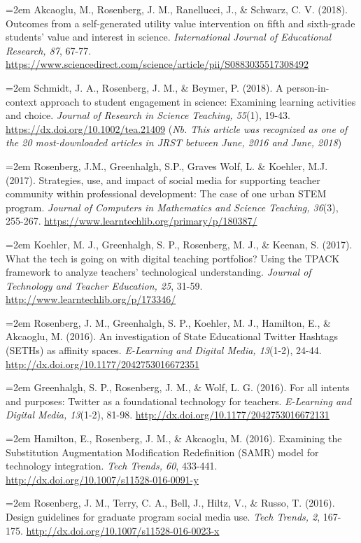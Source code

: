 \documentclass[14,]{article}
\begin{document}
\hangindent=2em Akcaoglu, M., Rosenberg, J. M., Ranellucci, J., \&
Schwarz, C. V. (2018). Outcomes from a self-generated utility value
intervention on fifth and sixth-grade students' value and interest in
science. \emph{International Journal of Educational Research, 87},
67-77.
\url{https://www.sciencedirect.com/science/article/pii/S0883035517308492}

\hangindent=2em Schmidt, J. A., Rosenberg, J. M., \& Beymer, P. (2018).
A person-in-context approach to student engagement in science: Examining
learning activities and choice. \emph{Journal of Research in Science
Teaching, 55}(1), 19-43. \url{https://dx.doi.org/10.1002/tea.21409}
(\emph{Nb. This article was recognized as one of the 20 most-downloaded
articles in JRST between June, 2016 and June, 2018})

\hangindent=2em Rosenberg, J.M., Greenhalgh, S.P., Graves Wolf, L. \&
Koehler, M.J. (2017). Strategies, use, and impact of social media for
supporting teacher community within professional development: The case
of one urban STEM program. \emph{Journal of Computers in Mathematics and
Science Teaching, 36}(3), 255-267.
\url{https://www.learntechlib.org/primary/p/180387/}

\hangindent=2em Koehler, M. J., Greenhalgh, S. P., Rosenberg, M. J., \&
Keenan, S. (2017). What the tech is going on with digital teaching
portfolios? Using the TPACK framework to analyze teachers' technological
understanding. \emph{Journal of Technology and Teacher Education, 25},
31-59. \url{http://www.learntechlib.org/p/173346/}

\hangindent=2em Rosenberg, J. M., Greenhalgh, S. P., Koehler, M. J.,
Hamilton, E., \& Akcaoglu, M. (2016). An investigation of State
Educational Twitter Hashtags (SETHs) as affinity spaces.
\emph{E-Learning and Digital Media, 13}(1-2), 24-44.
\url{http://dx.doi.org/10.1177/2042753016672351}

\hangindent=2em Greenhalgh, S. P., Rosenberg, J. M., \& Wolf, L. G.
(2016). For all intents and purposes: Twitter as a foundational
technology for teachers. \emph{E-Learning and Digital Media, 13}(1-2),
81-98. \url{http://dx.doi.org/10.1177/2042753016672131}

\hangindent=2em Hamilton, E., Rosenberg, J. M., \& Akcaoglu, M. (2016).
Examining the Substitution Augmentation Modification Redefinition (SAMR)
model for technology integration. \emph{Tech Trends, 60}, 433-441.
\url{http://dx.doi.org/10.1007/s11528-016-0091-y}

\hangindent=2em Rosenberg, J. M., Terry, C. A., Bell, J., Hiltz, V., \&
Russo, T. (2016). Design guidelines for graduate program social media
use. \emph{Tech Trends, 2}, 167-175.
\url{http://dx.doi.org/10.1007/s11528-016-0023-x}
\end{document}
